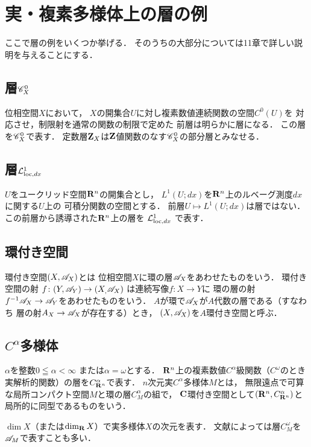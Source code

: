 \setcounter{section}{8}
\section{実・複素多様体上の層の例}
ここで層の例をいくつか挙げる．
そのうちの大部分については11章で詳しい説明を与えることにする．

\subsection{層\(\Conti_X^0\)}
位相空間\(X\)において，
\(X\)の開集合\(U\)に対し複素数値連続関数の空間\(C^0(U)\)を
対応させ，制限射を通常の関数の制限で定めた
前層は明らかに層になる．
この層を\(\Conti_X^0\)で表す．
定数層\(\zz_X\)は\(\zz\)値関数のなす\(\Conti_X^0\)の部分層とみなせる．

\subsection{層\(\Lloc[dx]\)}
\(U\)をユークリッド空間\(\rr^n\)の開集合とし，
\(L^1(U;dx)\)を\(\rr^n\)上のルベーグ測度\(dx\)に関する\(U\)上の
可積分関数の空間とする．
前層\(U\mapsto L^1(U;dx)\)は層ではない．
この前層から誘導された\(\rr^n\)上の層を
\(\Lloc[dx]\)
で表す．

\subsection{環付き空間}
環付き空間\((X,\scA_X)\)とは
位相空間\(X\)に環の層\(\scA_X\)をあわせたものをいう．
環付き空間の射
\(f\colon(Y,\scA_Y)\to(X_,\scA_X)\)
は連続写像\(f\colon X\to Y\)に
環の層の射\(f^{-1}\scA_X\to\scA_Y\)をあわせたものをいう．
\(A\)が環で\(\scA_X\)が\(A\)代数の層である（すなわち
層の射\(A_X\to\scA_X\)が存在する）とき，
\((X,\scA_X)\)を\(A\)環付き空間と呼ぶ．

\subsection{\(C^\alpha\)多様体}
\(\alpha\)を整数\(0\leqq\alpha<\infty\)
または\(\alpha=\omega\)とする．
\(\rr^n\)上の複素数値\(C^\alpha\)級関数（\(C^\omega\)のとき
実解析的関数）の層を\(C^\alpha_{\rr^n}\)で表す．
\(n\)次元実\(C^\alpha\)多様体\(M\)とは，
無限遠点で可算な局所コンパクト空間\(M\)と環の層\(C^\alpha_M\)の組で，
\(\cc\)環付き空間として\((\rr^n,C^\alpha_{\rr^n})\)と
局所的に同型であるものをいう．

\(\dim X\)（または\(\dim_\rr X\)）で実多様体\(X\)の次元を表す．
文献によっては層\(C^\omega_M\)を\(\scA_M\)で表すことも多い．

